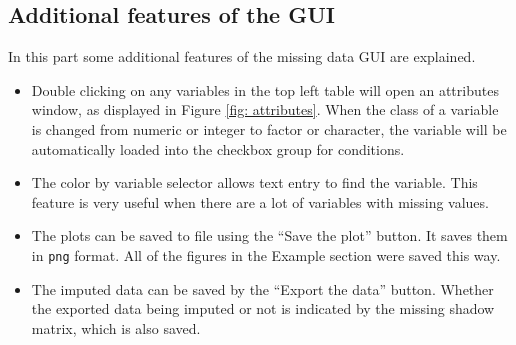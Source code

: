 \documentclass[english]{article}
\begin{document}
\subsection{Additional features of the GUI}
In this part some additional features of the missing data GUI are explained.
\begin{itemize}
\item Double clicking on any variables in the top left table will open an attributes window, as displayed in Figure \ref{fig: attributes}. When the class of a variable is changed from numeric or integer to factor or character, the variable will be automatically loaded into the checkbox group for conditions.
\item The color by variable selector allows text entry to find the variable.
This feature is very useful when there are a lot 
of variables with missing values.
%

\item The plots can be saved to file using the ``Save the plot'' button. It saves them in \texttt{png} format. All of the figures in the Example section were saved this way.
\item The imputed data can be saved by the ``Export the data'' button. Whether the exported data being imputed or not is indicated by the missing shadow matrix, which is also saved. 
\end{itemize}
%

\end{document}
